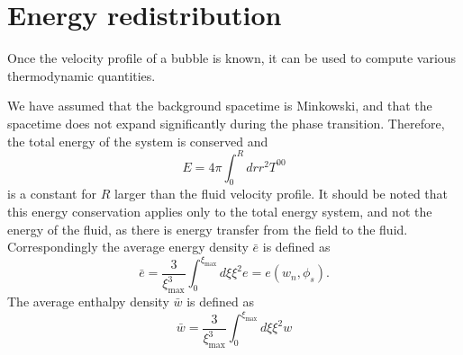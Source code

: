 \section{Energy redistribution}
\label{energy_redistribution}
Once the velocity profile of a bubble is known, it can be used to compute various thermodynamic quantities.

We have assumed that the background spacetime is Minkowski, and that the spacetime does not expand significantly during the phase transition.
Therefore, the total energy of the system is conserved and
\begin{equation}
E = 4 \pi \int_0^R dr r^2 T^{00}
\end{equation}
is a constant for $R$ larger than the fluid velocity profile.
It should be noted that this energy conservation applies only to the total energy system,
and not the energy of the fluid, as there is energy transfer from the field to the fluid.
\cite[p. 21]{lecture_notes}
Correspondingly the average energy density $\bar{e}$ is defined as \cite[p. 39]{lecture_notes}
\begin{equation}
\bar{e} = \frac{3}{\xi_\text{max}^3} \int_0^{\xi_\text{max}} d\xi \xi^2 e = e(w_n, \phi_s).
\label{eq:e_conservation}
\end{equation}
The average enthalpy density $\bar{w}$ is defined as
\begin{equation}
\bar{w} = \frac{3}{\xi_\text{max}^3} \int_0^{\xi_\text{max}} d\xi \xi^2 w
\label{eq:wbar}
\end{equation}

